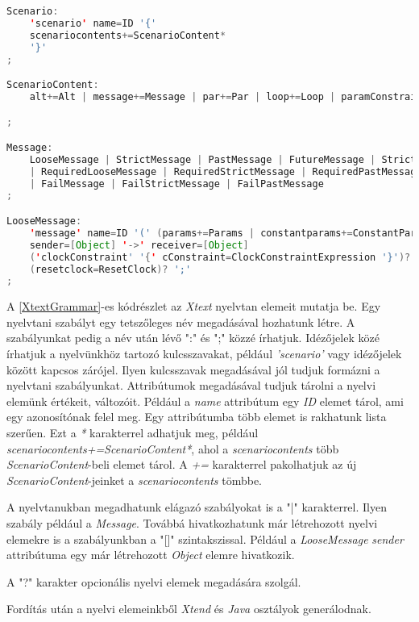 \begin{lstlisting}[language=java, frame=single, float=ht!, caption={Xtext nyelvtan elemei.},captionpos=b, label=XtextGrammar]
Scenario:
	'scenario' name=ID '{'
	scenariocontents+=ScenarioContent*
	'}'
;

ScenarioContent:
	alt+=Alt | message+=Message | par+=Par | loop+=Loop | paramConstraint+=ParameterConstraint

;

Message:
	LooseMessage | StrictMessage | PastMessage | FutureMessage | StrictFutureMessage
	| RequiredLooseMessage | RequiredStrictMessage | RequiredPastMessage | RequiredFutureMessage | RequiredStrictFutureMessage
	| FailMessage | FailStrictMessage | FailPastMessage
;

LooseMessage:
	'message' name=ID '(' (params+=Params | constantparams+=ConstantParams) ')'
	sender=[Object] '->' receiver=[Object]
	('clockConstraint' '{' cConstraint=ClockConstraintExpression '}')? 
	(resetclock=ResetClock)? ';'
;
\end{lstlisting}

A \ref{XtextGrammar}-es kódrészlet az \textit{Xtext} nyelvtan elemeit mutatja be.
Egy nyelvtani szabályt egy tetszőleges név megadásával hozhatunk létre.
A szabályunkat pedig a név után lévő ":" és ";" közzé írhatjuk.
Idézőjelek közé írhatjuk a nyelvünkhöz tartozó kulcsszavakat, például \textit{'scenario'} vagy idézőjelek között kapcsos zárójel.
Ilyen kulcsszavak megadásával jól tudjuk formázni a nyelvtani szabályunkat.
Attribútumok megadásával tudjuk tárolni a nyelvi elemünk értékeit, változóit.
Például a \textit{name} attribútum egy \textit{ID} elemet tárol, ami egy azonosítónak felel meg.
Egy attribútumba több elemet is rakhatunk lista szerűen.
Ezt a \textit{*} karakterrel adhatjuk meg, például \textit{scenariocontents+=ScenarioContent*}, ahol a \textit{scenariocontents} több \textit{ScenarioContent}-beli elemet tárol.
A \textit{+=} karakterrel pakolhatjuk az új \textit{ScenarioContent}-jeinket a \textit{scenariocontents} tömbbe.

A nyelvtanukban megadhatunk elágazó szabályokat is a "|" karakterrel.
Ilyen szabály például a \textit{Message}.
Továbbá hivatkozhatunk már létrehozott nyelvi elemekre is a szabályunkban a "[]" szintakszissal.
Például a \textit{LooseMessage} \textit{sender} attribútuma egy már létrehozott \textit{Object} elemre hivatkozik.

A "?" karakter opcionális nyelvi elemek megadására szolgál.

Fordítás után a nyelvi elemeinkből \textit{Xtend} és \textit{Java} osztályok generálodnak.

